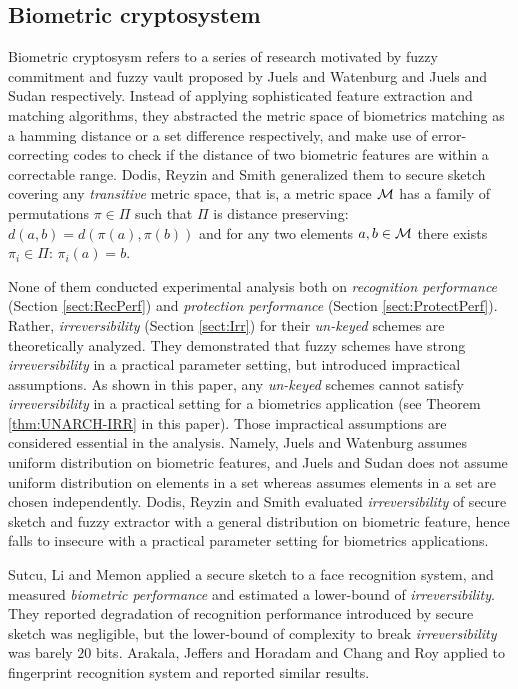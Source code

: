 \subsection{Biometric cryptosystem}
Biometric cryptosysm refers to a series of research motivated by fuzzy commitment and fuzzy vault proposed by Juels and Watenburg\cite{Juels:1999kz} and Juels and Sudan\cite{Juels:2002hd} respectively. Instead of applying sophisticated feature extraction and matching algorithms, they abstracted the metric space of biometrics matching as a hamming distance or a set difference respectively, and make use of error-correcting codes to check if the distance of two biometric features are within a correctable range. Dodis, Reyzin and Smith\cite{Dodis:2004uh} generalized them to secure sketch covering any {\it transitive} metric space, that is, a metric space $\cal M$ has a family of permutations $\pi \in \Pi$ such that $\Pi$ is distance preserving: $d(a,b)=d(\pi(a),\pi(b))$ and for any two elements $a,b \in \cal M$ there exists $\pi_i \in \Pi$: $\pi_i(a)=b$. 

None of them conducted experimental analysis both on  {\it recognition performance} (Section \ref{sect:RecPerf}) and {\it protection performance} (Section \ref{sect:ProtectPerf}). Rather, {\it irreversibility} (Section \ref{sect:Irr}) for their {\it un-keyed} schemes are theoretically analyzed. They demonstrated that fuzzy schemes have strong {\it irreversibility} in a practical parameter setting, but introduced impractical assumptions. As shown in this paper, any {\it un-keyed} schemes cannot satisfy {\it irreversibility} in a practical setting for a biometrics application (see Theorem \ref{thm:UNARCH-IRR} in this paper). Those impractical assumptions are considered essential in the analysis. Namely, Juels and Watenburg\cite{Juels:1999kz} assumes uniform distribution on biometric features, and Juels and Sudan\cite{Juels:2002hd} does not assume uniform distribution on elements in a set whereas assumes elements in a set are chosen independently. Dodis, Reyzin and Smith\cite{Dodis:2004uh} evaluated  {\it irreversibility} of secure sketch and fuzzy extractor with a general distribution on biometric feature, hence falls to insecure with a practical parameter setting for biometrics applications.

Sutcu, Li and Memon\cite{Sutcu:2007um} applied a secure sketch\cite{Dodis:2004uh} to a face recognition system, and measured {\it biometric performance} and estimated a lower-bound of {\it irreversibility}. They reported degradation of recognition performance introduced by secure sketch was negligible, but the lower-bound of complexity to break {\it irreversibility} was barely $20$ bits. Arakala, Jeffers and Horadam\cite{Arakala:2007vv} and Chang and Roy\cite{Chang:2007wz} applied to fingerprint recognition system and reported similar results.


